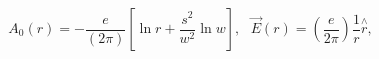 \begin{equation}
A_{0}(r)=-\frac{e}{(2\pi)}\left[  \ln r+\frac{s^{2}}{w^{2}}\ln w\right]
,\text{ \ \ \ \ }\overrightarrow{E}(r)=\left(  \frac{e}{2\pi}\right)  \frac
{1}{r}\overset{\wedge}{r},
\end{equation}

